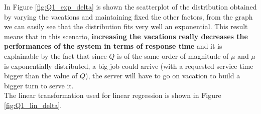 \documentclass{article}
\begin{document}
                    In Figure \ref{fig:Q1_exp_delta} is shown the scatterplot of the distribution obtained by varying the vacations and maintaining fixed the other factors, from the graph we can easily see that the distribution fits very well an exponential. 
                    This result means that in this scenario, \textbf{increasing the vacations really decreases the performances of the system in terms of response time} and it is explainable by the fact that since $Q$ is of the same order of magnitude of $\mu$ and $\mu$ is exponentially distributed, a big job could arrive (with a requested service time bigger than the value of $Q$), the server will have to go on vacation to build a bigger turn to serve it.\\
                    
                    The linear transformation used for linear regression is shown in Figure \ref{fig:Q1_lin_delta}.          
                    
\end{document}
